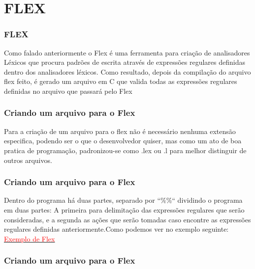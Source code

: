 \documentclass{beamer}
\begin{document}
\section{FLEX}			%
\begin{frame}
\frametitle{FLEX}
  Como falado anteriormente o Flex é uma ferramenta para criação de analisadores Léxicos que
 procura padrões de escrita através de expressões regulares definidas dentro dos analisadores léxicos.
  Como resultado, depois da compilação do arquivo flex feito, é gerado um arquivo em C que valida
 todas as expressões regulares definidas no arquivo que passará pelo Flex
 

\end{frame}

\begin{frame}
\frametitle{Criando um arquivo para o Flex}

  Para a criação de um arquivo para o flex não é necessário nenhuma extensão especifica, podendo ser 
 o que o desenvolvedor quiser, mas como um ato de boa pratica de programação, padronizou-se como .lex ou 
 .l para melhor distinguir de outros arquivos.

\end{frame}
\begin{frame}
\frametitle{Criando um arquivo para o Flex}

  Dentro do programa há duas partes, separado por ``\%\%`` dividindo o programa em duas partes: %
A primeira para delimitação das expressões regulares que serão consideradas, e a segunda as ações que serão
tomadas caso encontre as expressões regulares definidas anteriormente.Como podemos ver no exemplo seguinte:
 \href{https://github.com/Walderi/compz-equipe-01-2013-1/blob/master/ValidaEmailFlex/valida_email.lex}{\textcolor{red}{Exemplo de Flex}}
 
\end{frame}
\begin{frame}

\frametitle{Criando um arquivo para o Flex}




\end{frame}
\end{document}
